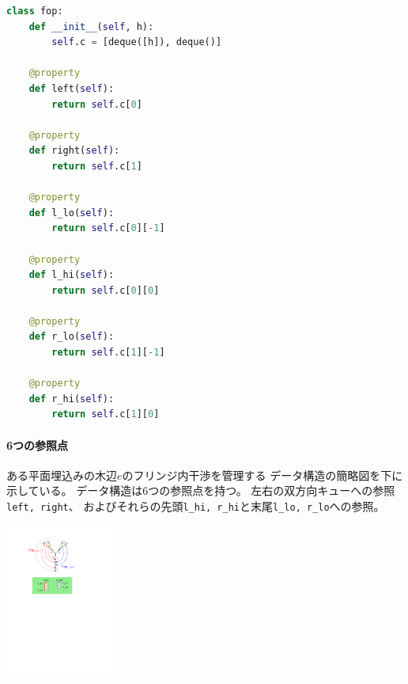 \begin{paracol}{2}
\begin{lstlisting}[language=Python, caption=fringe\_opposed\_subset,escapechar=!,
                   label=lst:fringe_opposed_subset]
class fop:
    def __init__(self, h):
        self.c = [deque([h]), deque()]

    @property
    def left(self):
        return self.c[0]

    @property
    def right(self):
        return self.c[1]

    @property
    def l_lo(self):
        return self.c[0][-1]

    @property
    def l_hi(self):
        return self.c[0][0]

    @property
    def r_lo(self):
        return self.c[1][-1]

    @property
    def r_hi(self):
        return self.c[1][0]
\end{lstlisting}

\switchcolumn
\vspace*{.5\intextsep}

\paragraph{6つの参照点}
ある平面埋込みの木辺$e$のフリンジ内干渉を管理する
データ構造の簡略図を下に示している。
データ構造は6つの参照点を持つ。
左右の双方向キューへの参照{\tt left, right}、
およびそれらの先頭{\tt l\_hi, r\_hi}と末尾{\tt l\_lo, r\_lo}への参照。

\vspace{0.5\intextsep}
\includegraphics[width=0.27\textwidth]{figures/ds_of_fops.pdf}


\end{paracol}


